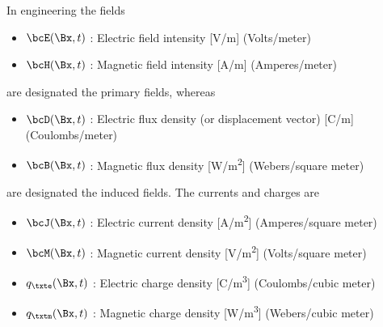 %
%
In engineering the fields
\begin{itemize}
	\item \( \bcE(\Bx, t) \) : Electric field intensity [\si{V/m}] (Volts/meter)
	\item \( \bcH(\Bx, t) \) : Magnetic field intensity [\si{A/m}] (Amperes/meter)
\end{itemize}
are designated the primary fields, whereas
\begin{itemize}
	\item \( \bcD(\Bx, t) \) : Electric flux density (or displacement vector) [\si{C/m}] (Coulombs/meter)
	\item \( \bcB(\Bx, t) \) : Magnetic flux density [\si{W/m^2}] (Webers/square meter)
\end{itemize}
are designated the induced fields.  The currents and charges are
\begin{itemize}
	\item \( \bcJ(\Bx, t) \) : Electric current density [\si{A/m^2}] (Amperes/square meter)
	\item \( \bcM(\Bx, t) \) : Magnetic current density [\si{V/m^2}] (Volts/square meter)
	\item \( q_\txte(\Bx, t) \) : Electric charge density [\si{C/m^3}] (Coulombs/cubic meter)
	\item \( q_\txtm(\Bx, t) \) : Magnetic charge density [\si{W/m^3}] (Webers/cubic meter)
\end{itemize}
